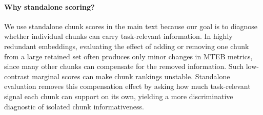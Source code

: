 \documentclass[11pt]{article}
\begin{document}
\begin{table}[h]
    \centering
    \caption{Per-task importance definition comparison for RoBERTa-Large at 256 retained dimensions (chunk size $w=4$). Spearman correlations and normalized entropy for standalone, Leave-one-out, marginal, and Shapley importance. Low standalone-to-alternative correlations confirm importance is context-dependent.}
    \label{tab:loo_detailed}
    \small
\end{table}

\paragraph{Why standalone scoring?}
We use standalone chunk scores in the main text because our goal is to diagnose whether individual chunks can carry task-relevant information. In highly redundant embeddings, evaluating the effect of adding or removing one chunk from a large retained set often produces only minor changes in MTEB metrics, since many other chunks can compensate for the removed information. Such low-contrast marginal scores can make chunk rankings unstable. Standalone evaluation removes this compensation effect by asking how much task-relevant signal each chunk can support on its own, yielding a more discriminative diagnostic of isolated chunk informativeness.
\end{document}
